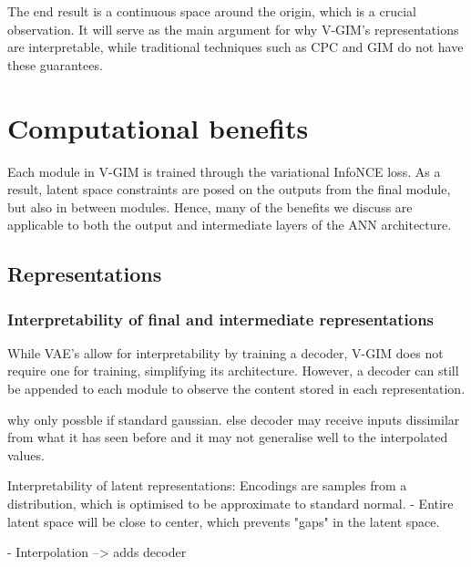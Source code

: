 			The end result is a continuous space around the origin, which is a crucial observation. It will serve as the main argument for why V-GIM's representations are interpretable, while traditional techniques such as CPC and GIM do not have these guarantees. %
			


		
	
	
	
\section{Computational benefits}
Each module in V-GIM is trained through the variational InfoNCE loss. As a result, latent space constraints are posed on the outputs from the final module, but also in between modules. Hence, many of the benefits we discuss are applicable to both the output and intermediate layers of the ANN architecture.


\subsection{Representations}
	\subsubsection{Interpretability of final and intermediate representations}
		
		
		
		
		While VAE's allow for interpretability by training a decoder, V-GIM does not require one for training, simplifying its architecture. However, a decoder can still be appended to each module to observe the content stored in each representation. 
		
		
		
		why only possble if standard gaussian.
			else decoder may receive inputs dissimilar from what it has seen before and it may not generalise well to the interpolated values.
	
	
	Interpretability of latent representations:
		Encodings are samples from a distribution, which is optimised to be approximate to standard normal.
		- Entire latent space will be close to center, which prevents "gaps" in the latent space.

		- Interpolation --> adds decoder
		
